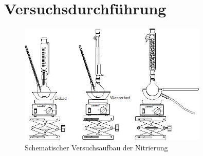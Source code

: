 \section{Versuchsdurchführung}
\label{sec:durchfuerung}

\begin{figure}[h!]
	\centering
	\includegraphics[width=0.8\textwidth]{img/versuchsaufbau}
	\caption{Schematischer Versuchsaufbau der Nitrierung}
	\label{fig:versuchsaufbau}
\end{figure}
\FloatBarrier
\vspace*{-5mm}

